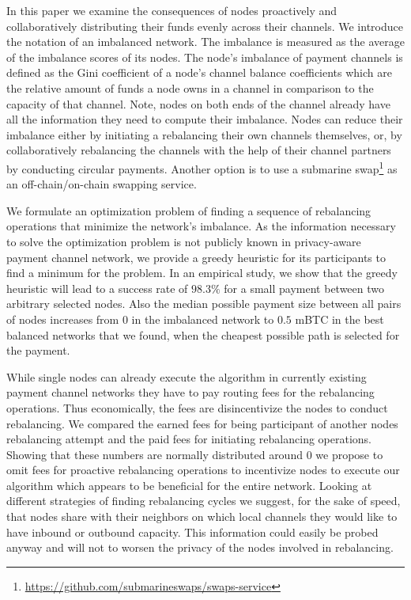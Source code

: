 \documentclass[conference]{IEEEtran}
\begin{document}
In this paper we examine the consequences of nodes proactively and collaboratively distributing their funds evenly across their channels.
We introduce the notation of an imbalanced network.
The imbalance is measured as the average of the imbalance scores of its nodes.
The node's imbalance of payment channels is defined as the Gini coefficient of a node's channel balance coefficients which are the relative amount of funds a node owns in a channel in comparison to the capacity of that channel.
Note, nodes on both ends of the channel already have all the information they need to compute their imbalance. 
Nodes can reduce their imbalance either by initiating a rebalancing their own channels themselves, or, by collaboratively rebalancing the channels with the help of their channel partners by conducting circular payments.
Another option is to use a submarine swap\footnote{\url{https://github.com/submarineswaps/swaps-service}} as an off-chain/on-chain swapping service.

We formulate an optimization problem of finding a sequence of rebalancing operations that minimize the network's imbalance.
As the information necessary to solve the optimization problem is not publicly known in privacy-aware payment channel network, we provide a greedy heuristic for its participants to find a minimum for the problem. 
In an empirical study, we show that the greedy heuristic will lead to a success rate of $98.3\%$ for a small payment between two arbitrary selected nodes.
Also the median possible payment size between all pairs of nodes increases from $0$ in the imbalanced network to $0.5$ mBTC in the best balanced networks that we found, when the cheapest possible path is selected for the payment.

While single nodes can already execute the algorithm in currently existing payment channel networks they have to pay routing fees for the rebalancing operations.
Thus economically, the fees are disincentivize the nodes to conduct rebalancing.
We compared the earned fees for being participant of another nodes rebalancing attempt and the paid fees for initiating rebalancing operations.
Showing that these numbers are normally distributed around $0$ we propose to omit fees for proactive rebalancing operations to incentivize nodes to execute our algorithm which appears to be beneficial for the entire network. 
Looking at different strategies of finding rebalancing cycles we suggest, for the sake of speed, that nodes share with their neighbors on which local channels they would like to have inbound or outbound capacity.
This information could easily be probed anyway and will not to worsen the privacy of the nodes involved in rebalancing.
\end{document}
